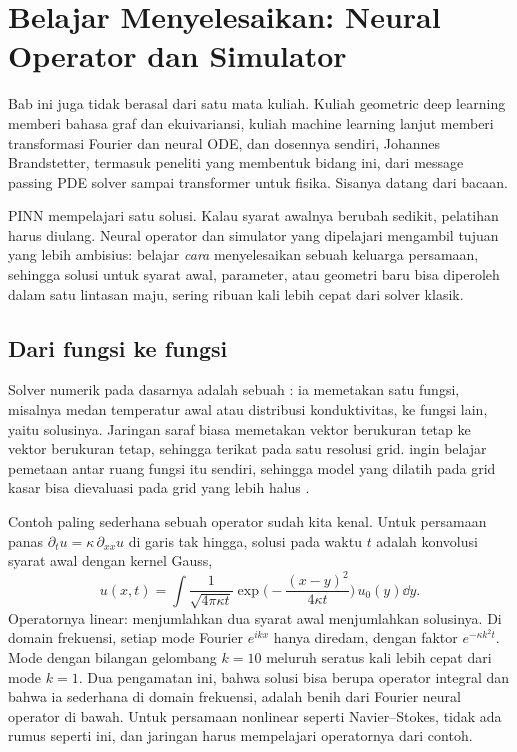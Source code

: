 \chapter{Belajar Menyelesaikan: Neural Operator dan Simulator}
\label{ch:operator}

Bab ini juga tidak berasal dari satu mata kuliah. Kuliah geometric deep learning memberi bahasa graf dan
ekuivariansi, kuliah machine learning lanjut memberi transformasi Fourier dan neural ODE, dan dosennya
sendiri, Johannes Brandstetter, termasuk peneliti yang membentuk bidang ini, dari message passing PDE
solver sampai transformer untuk fisika. Sisanya datang dari bacaan.

PINN mempelajari satu solusi. Kalau syarat awalnya berubah sedikit, pelatihan harus diulang. Neural
operator dan simulator yang dipelajari mengambil tujuan yang lebih ambisius: belajar \emph{cara}
menyelesaikan sebuah keluarga persamaan, sehingga solusi untuk syarat awal, parameter, atau geometri baru
bisa diperoleh dalam satu lintasan maju, sering ribuan kali lebih cepat dari solver klasik.

\section{Dari fungsi ke fungsi}

Solver numerik pada dasarnya adalah sebuah : ia memetakan satu fungsi, misalnya medan
temperatur awal atau distribusi konduktivitas, ke fungsi lain, yaitu solusinya. Jaringan saraf biasa
memetakan vektor berukuran tetap ke vektor berukuran tetap, sehingga terikat pada satu resolusi grid.
 ingin belajar pemetaan antar ruang fungsi itu sendiri, sehingga model yang
dilatih pada grid kasar bisa dievaluasi pada grid yang lebih halus \citep{kovachki2023}.

Contoh paling sederhana sebuah operator sudah kita kenal. Untuk persamaan panas
$\partial_tu=\kappa\,\partial_{xx}u$ di garis tak hingga, solusi pada waktu $t$ adalah konvolusi syarat awal dengan kernel
Gauss,
\begin{equation}
u(x,t)=\int\frac{1}{\sqrt{4\pi\kappa t}}\exp\Big(-\frac{(x-y)^2}{4\kappa t}\Big)\,u_0(y)\dd y .
\end{equation}
Operatornya linear: menjumlahkan dua syarat awal menjumlahkan solusinya. Di domain frekuensi, setiap mode Fourier
$e^{ikx}$ hanya diredam, dengan faktor $e^{-\kappa k^2t}$. Mode dengan bilangan gelombang $k=10$ meluruh seratus kali
lebih cepat dari mode $k=1$. Dua pengamatan ini, bahwa solusi bisa berupa operator integral dan bahwa ia sederhana di
domain frekuensi, adalah benih dari Fourier neural operator di bawah. Untuk persamaan nonlinear seperti
Navier--Stokes, tidak ada rumus seperti ini, dan jaringan harus mempelajari operatornya dari contoh.

